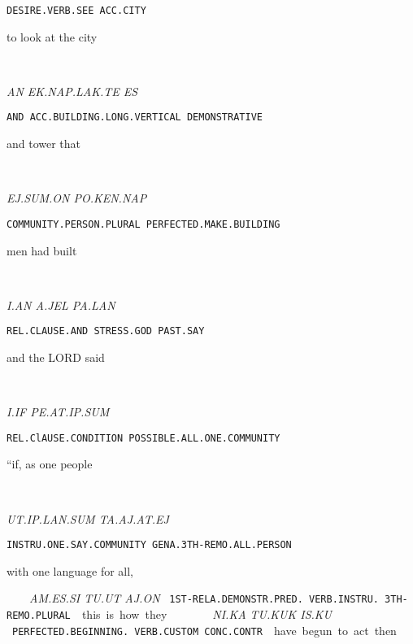 {{{\tt DESIRE.VERB.SEE	ACC.CITY }

to look			at the city 

\drie 
  
\an~\ek\nap\lak\te ~\es

{\it AN	EK.NAP.LAK.TE			ES			 }

{\tt AND	ACC.BUILDING.LONG.VERTICAL	DEMONSTRATIVE	 }

and 	tower 				that 			 

\drie 

\ej\Atlansum\on ~ \po\ken\nap

{\it EJ.SUM.ON			PO.KEN.NAP }

{\tt COMMUNITY.PERSON.PLURAL	PERFECTED.MAKE.BUILDING }

men				had built 

  
\drie 

\Atlani\an ~ \Atlana\jel~\pa\lan

{\it I.AN			A.JEL		PA.LAN }

{\tt REL.CLAUSE.AND              STRESS.GOD	PAST.SAY }

and 			the LORD            said 

\drie 

\Atlani\Atlanif~\pe\at\ip\Atlansum

{\it I.IF			PE.AT.IP.SUM				 }

{\tt REL.ClAUSE.CONDITION	POSSIBLE.ALL.ONE.COMMUNITY		 }

“if, 			as one people 		
\drie 


\ut\ip\lan\Atlansum~\ta\aj\at\ej\comma

{\it UT.IP.LAN.SUM			TA.AJ.AT.EJ }

{\tt INSTRU.ONE.SAY.COMMUNITY	GENA.3TH-REMO.ALL.PERSON	 }

with one language 		for all, 
\drie 

\am\es\si~\tu\ut~\aj\on
 
{\it AM.ES.SI			TU.UT		AJ.ON }

{\tt 1ST-RELA.DEMONSTR.PRED.	VERB.INSTRU.    3TH-REMO.PLURAL }

this is 				how       	they  
  
\drie 

\Atlanni\ka~\tu\kuk~\is\ku

{\it NI.KA				TU.KUK		IS.KU                    } 

{\tt PERFECTED.BEGINNING.                 VERB.CUSTOM	CONC.CONTR	 }

have begun 			to act		then 		 
\drie 


}}
